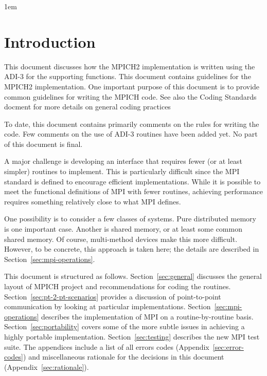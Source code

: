 \documentclass{article}
\begin{document}


{}

\clearpage

\tableofcontents
\clearpage


\raggedright
\parindent 1em
\pagestyle{headings}

\section{Introduction}
This document discusses how the MPICH2 implementation is written using
the ADI-3 \cite{adi3man} for the supporting functions.  This document
contains guidelines for the MPICH2 implementation.  One important
purpose of this document is to provide common guidelines for writing
the MPICH code. 
See also the Coding Standards docment \cite{coding-standards} for more
details on general coding practices

To date, this document contains primarily comments on the rules for
writing the code.  Few comments on the use of ADI-3 routines have been
added yet.  No part of this document is final.

A major challenge is developing an interface that requires fewer (or
at least simpler) routines to implement.  This is particularly
difficult since the MPI standard is defined to encourage efficient
implementations.  While it is possible to meet the functional
definitions of MPI with fewer routines, achieving performance requires
something relatively close to what MPI defines.

One possibility is to consider a few classes of systems.  Pure
distributed memory is one important case.  Another is shared memory,
or at least some common shared memory.  Of course, multi-method
devices make this more difficult.  However, to be concrete, this
approach is taken here; the details are described in
Section~\ref{sec:mpi-operations}.

This document is structured as follows.  Section~\ref{sec:general} discusses
the general layout of MPICH project and recommendations for coding the
routines.  Section~\ref{sec:pt-2-pt-scenarios} provides a discussion of
point-to-point communication by looking at particular implementations.
Section~\ref{sec:mpi-operations} describes the implementation of
MPI on a routine-by-routine basis.  Section~\ref{sec:portability} covers some
of the more subtle issues in achieving a highly portable implementation.
Section~\ref{sec:testing} describes the new MPI test suite.  The appendices
include a list of all errors codes (Appendix~\ref{sec:error-codes}) and
miscellaneous rationale for the decisions in this document
(Appendix~\ref{sec:rationale}). 
\end{document}
